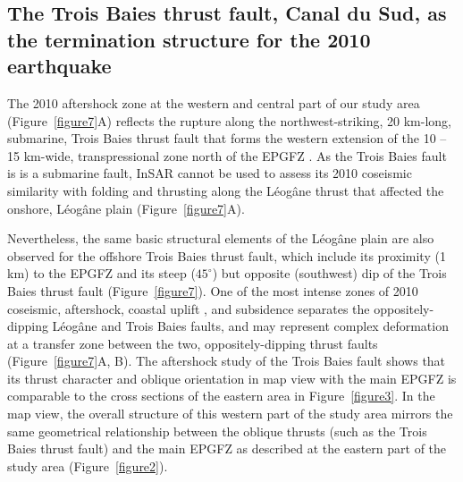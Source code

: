 \documentclass[linenumbers,draft]{agujournal}
\begin{document}
\subsection{The Trois Baies thrust fault, Canal du Sud, as the termination structure for the 2010 earthquake}
The 2010 aftershock zone at the western and central part of our study area (Figure~\ref{figure7}A) reflects the rupture along the northwest-striking, 20 km-long, submarine, Trois Baies thrust fault that forms the western extension of the 10 -- 15 km-wide, transpressional zone north of the EPGFZ \citep{mercier20112010}. As the Trois Baies fault is is a submarine fault, InSAR cannot be used to assess its 2010 coseismic similarity with folding and thrusting along the L\'eog\^ane thrust that affected the onshore, L\'eog\^ane plain (Figure~\ref{figure7}A). 

Nevertheless, the same basic structural elements of the L\'eog\^ane plain are also observed for the offshore Trois Baies thrust fault, which include its proximity (1 km) to the EPGFZ and its steep ($45^{\circ}$) but opposite (southwest) dip of the Trois Baies thrust fault (Figure~\ref{figure7}). One of the most intense zones of 2010 coseismic, aftershock, coastal uplift \citep{hashimoto2011fan}, and subsidence \citep{prentice2010seismic} separates the oppositely-dipping L\'eog\^ane and Trois Baies faults, and may represent complex deformation at a transfer zone between the two, oppositely-dipping thrust faults (Figure~\ref{figure7}A, B). The aftershock study of the Trois Baies fault \citep{symithe2016present} shows that its thrust character and oblique orientation in map view with the main EPGFZ is comparable to the cross sections of the eastern area in Figure~\ref{figure3}. In the map view, the overall structure of this western part of the study area mirrors the same geometrical relationship between the oblique thrusts (such as the Trois Baies thrust fault) and the main EPGFZ as described at the eastern part of the study area (Figure~\ref{figure2}).
\end{document}
